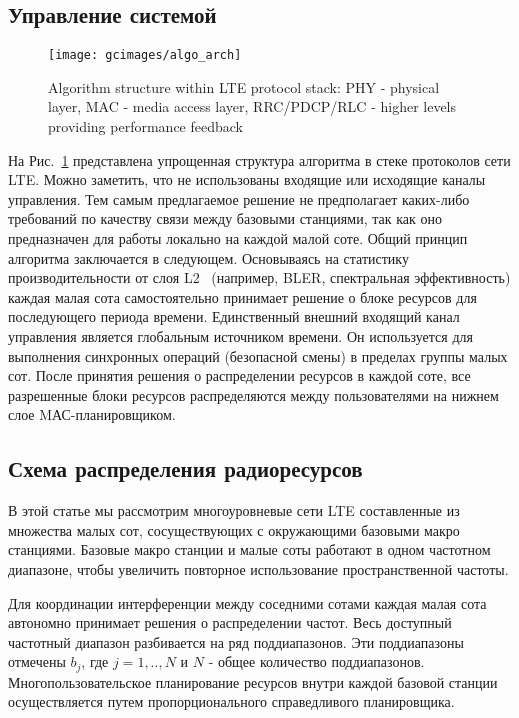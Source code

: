 \subsection{Управление системой}
\begin{figure}[h]
    \centering
    \texttt{[image: gcimages/algo\_arch]}
    \caption{Algorithm structure within LTE protocol stack: PHY - physical layer, MAC - media access layer, RRC/PDCP/RLC - higher levels providing performance feedback}
    \label{fig:algo_arch}
\end{figure}

На Рис.~\ref{fig:algo_arch} представлена упрощенная структура алгоритма в стеке протоколов сети LTE. Можно заметить, что не использованы входящие или исходящие каналы управления. Тем самым предлагаемое решение не предполагает каких-либо требований по качеству связи между базовыми станциями, так как оно предназначен для работы локально на каждой малой соте.
Общий принцип алгоритма заключается в следующем. Основываясь на статистику производительности от слоя L2~\cite{TS36.300} (например, BLER, спектральная эффективность) каждая малая сота самостоятельно принимает решение о блоке ресурсов для последующего периода времени. Единственный внешний входящий канал управления является глобальным источником времени. Он используется для выполнения синхронных операций (безопасной смены) в пределах группы малых сот. После принятия решения о распределении ресурсов в каждой соте, все разрешенные блоки ресурсов распределяются между пользователями на нижнем слое MАС-планировщиком.

\subsection{Схема распределения радиоресурсов}
В этой статье мы рассмотрим многоуровневые сети LTE составленные из множества малых сот, сосуществующих с окружающими базовыми макро станциями. Базовые макро станции и малые соты работают в одном частотном диапазоне, чтобы увеличить повторное использование пространственной частоты.

Для координации интерференции между соседними сотами каждая малая сота автономно принимает решения о распределении частот. Весь доступный частотный диапазон разбивается на ряд поддиапазонов. Эти поддиапазоны отмечены $b_{j}$, где $j=1, .., N$ и $N$ - общее количество поддиапазонов. Многопользовательское планирование ресурсов внутри каждой базовой станции осуществляется путем пропорционального справедливого планировщика.

